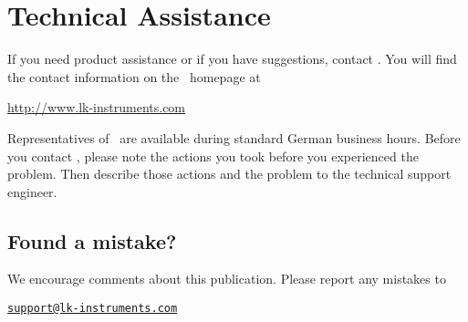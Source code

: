 \section*{Technical Assistance}
If you need product assistance or if you have suggestions, contact \docAuthor.
You will find the contact information on the \docAuthor~homepage at
\begin{center}
  \url{http://www.lk-instruments.com}
\end{center}
Representatives of \docAuthor~are available during standard German business hours.
Before you contact \docAuthor, please note the actions you took before you experienced
the problem. Then describe those actions and the problem to the technical support
engineer.

\subsection*{Found a mistake?}
We encourage comments about this publication. Please report any mistakes
to
\begin{center}
  \href{mailto:support@lk-instruments.com}{\nolinkurl{support@lk-instruments.com}}
\end{center}






\newpage